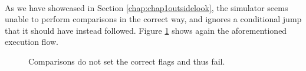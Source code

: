 \paragraph{}
As we have showcased in Section \ref{chap:chap1outsidelook}, the simulator seems unable to perform comparisons in the correct way, and ignores a conditional jump that it should have instead followed. Figure \ref{fig:flagbug2} shows again the aforementioned execution flow.
\begin{figure}[H]
	\centering
	\caption{Comparisons do not set the correct flags and thus fail.}
        \label{fig:flagbug2}
\end{figure}
